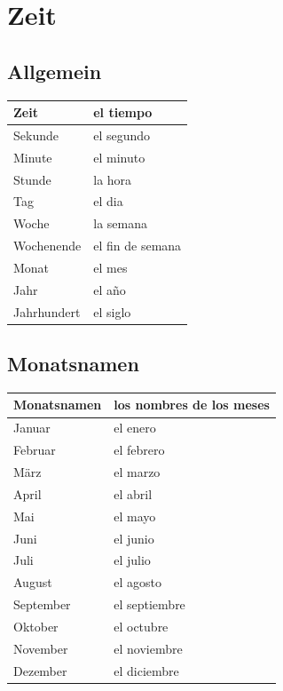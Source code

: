 \documentclass{spanish_summary}
\begin{document}
\chapter*{Zeit}
\section*{Allgemein}
\begin{longtable}{p{} | p{}} 
\textbf{Zeit}     & \textbf{el tiempo}                                       \\ \hline
\hline
\endhead %
Sekunde & el segundo\\
Minute & el minuto\\
Stunde & la hora\\
Tag & el dia\\
Woche & la semana\\
Wochenende & el fin de semana\\
Monat & el mes\\
Jahr & el a\~{n}o\\
Jahrhundert & el siglo \\

\end{longtable}

\section*{Monatsnamen}
\begin{longtable}{p{} | p{}} 
\textbf{Monatsnamen}     & \textbf{los nombres de los meses}                                       \\ \hline
\hline
\endhead %
Januar & el enero\\
Februar & el febrero\\
März & el marzo\\
April & el abril\\
Mai & el mayo\\
Juni & el junio\\
Juli & el julio\\
August & el agosto\\
September & el septiembre\\
Oktober & el octubre\\
November & el noviembre \\
Dezember & el diciembre \\
\end{longtable}
\end{document}
